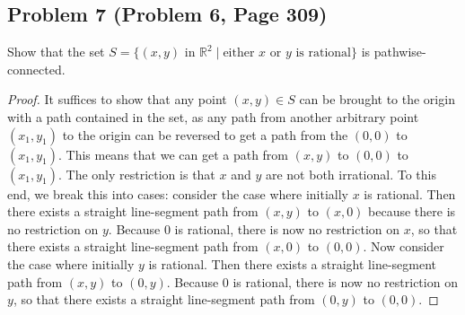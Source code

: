 \documentclass{article}
\begin{document}
\subsection*{Problem 7 (Problem 6, Page 309)}
Show that the set $S = \{(x, y) \text{ in } \mathbb{R}^2 \mid \text{either $x$ or $y$ is rational}\}$ is pathwise-connected.
\begin{proof}
It suffices to show that any point $(x, y) \in S$ can be brought to the origin with a path contained in the set, as any path from another arbitrary point $(x_1, y_1)$ to the origin can be reversed to get a path from the $(0, 0)$ to $(x_1, y_1)$. This means that we can get a path from $(x, y)$ to $(0, 0)$ to $(x_1, y_1)$. The only restriction is that $x$ and $y$ are not both irrational. To this end, we break this into cases: consider the case where initially $x$ is rational. Then there exists a straight line-segment path from $(x, y)$ to $(x, 0)$ because there is no restriction on $y$. Because $0$ is rational, there is now no restriction on $x$, so that there exists a straight line-segment path from $(x, 0)$ to $(0, 0)$. Now consider the case where initially $y$ is rational. Then there exists a straight line-segment path from $(x, y)$ to $(0, y)$. Because $0$ is rational, there is now no restriction on $y$, so that there exists a straight line-segment path from $(0, y)$ to $(0, 0)$.
\end{proof}
\end{document}
